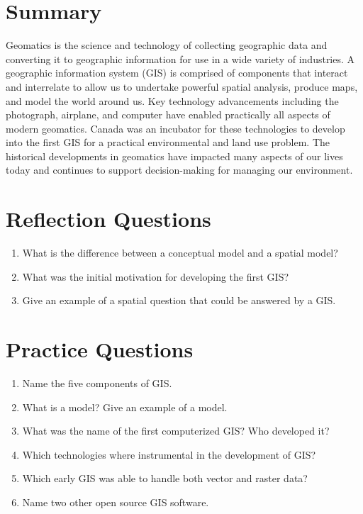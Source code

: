 \documentclass[
]{book}
\providecommand{\tightlist}{%
  \setlength{\itemsep}{0pt}\setlength{\parskip}{0pt}}
\begin{document}
\section{Summary}\label{summary}

Geomatics is the science and technology of collecting geographic data and converting it to geographic information for use in a wide variety of industries. A geographic information system (GIS) is comprised of components that interact and interrelate to allow us to undertake powerful spatial analysis, produce maps, and model the world around us. Key technology advancements including the photograph, airplane, and computer have enabled practically all aspects of modern geomatics. Canada was an incubator for these technologies to develop into the first GIS for a practical environmental and land use problem. The historical developments in geomatics have impacted many aspects of our lives today and continues to support decision-making for managing our environment.

\section*{Reflection Questions}\label{reflection-questions}

\begin{enumerate}
\def\labelenumi{\arabic{enumi}.}
\tightlist
\item
  What is the difference between a conceptual model and a spatial model?
\item
  What was the initial motivation for developing the first GIS?
\item
  Give an example of a spatial question that could be answered by a GIS.
\end{enumerate}

\section*{Practice Questions}\label{practice-questions}

\begin{enumerate}
\def\labelenumi{\arabic{enumi}.}
\tightlist
\item
  Name the five components of GIS.
\item
  What is a model? Give an example of a model.
\item
  What was the name of the first computerized GIS? Who developed it?
\item
  Which technologies where instrumental in the development of GIS?
\item
  Which early GIS was able to handle both vector and raster data?
\item
  Name two other open source GIS software.
\end{enumerate}
\end{document}

